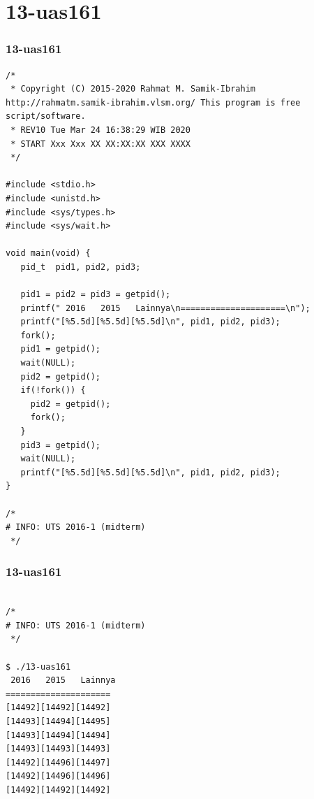 \documentclass[aspectratio=169, xcolor=table, notheorems, hyperref={pdfpagelabels=false}]{beamer}
\begin{document}
\section{13-uas161}
\begin{frame}[fragile]
\frametitle{13-uas161}
\begin{lstlisting}[basicstyle=\ttfamily\tiny]
/*
 * Copyright (C) 2015-2020 Rahmat M. Samik-Ibrahim http://rahmatm.samik-ibrahim.vlsm.org/ This program is free script/software.
 * REV10 Tue Mar 24 16:38:29 WIB 2020
 * START Xxx Xxx XX XX:XX:XX XXX XXXX
 */

#include <stdio.h>
#include <unistd.h>
#include <sys/types.h>
#include <sys/wait.h>

void main(void) {
   pid_t  pid1, pid2, pid3;

   pid1 = pid2 = pid3 = getpid();
   printf(" 2016   2015   Lainnya\n=====================\n");
   printf("[%5.5d][%5.5d][%5.5d]\n", pid1, pid2, pid3);
   fork(); 
   pid1 = getpid();
   wait(NULL);
   pid2 = getpid();
   if(!fork()) {
     pid2 = getpid();
     fork();
   }
   pid3 = getpid();
   wait(NULL);
   printf("[%5.5d][%5.5d][%5.5d]\n", pid1, pid2, pid3);
}

/*
# INFO: UTS 2016-1 (midterm)
 */

\end{lstlisting}
\end{frame}

\begin{frame}[fragile]
\frametitle{13-uas161}
\begin{lstlisting}[basicstyle=\ttfamily\large]        %  54

/*
# INFO: UTS 2016-1 (midterm)
 */

$ ./13-uas161 
 2016   2015   Lainnya
=====================
[14492][14492][14492]
[14493][14494][14495]
[14493][14494][14494]
[14493][14493][14493]
[14492][14496][14497]
[14492][14496][14496]
[14492][14492][14492]

\end{lstlisting}
\end{frame}
\end{document}
